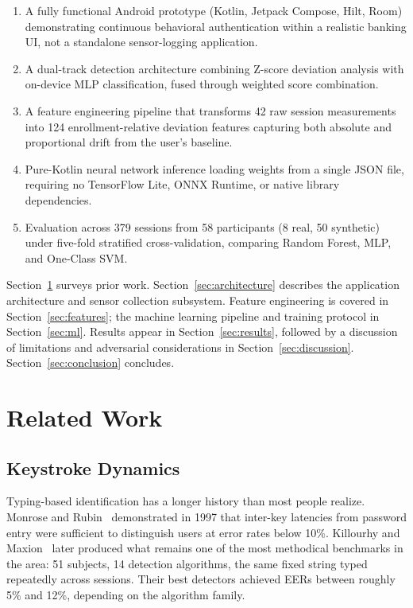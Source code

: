 \documentclass[conference]{IEEEtran}
\begin{document}
\begin{enumerate}
\item A fully functional Android prototype (Kotlin, Jetpack Compose, Hilt, Room) demonstrating continuous behavioral authentication within a realistic banking UI, not a standalone sensor-logging application.
\item A dual-track detection architecture combining Z-score deviation analysis with on-device MLP classification, fused through weighted score combination.
\item A feature engineering pipeline that transforms 42 raw session measurements into 124 enrollment-relative deviation features capturing both absolute and proportional drift from the user's baseline.
\item Pure-Kotlin neural network inference loading weights from a single JSON file, requiring no TensorFlow Lite, ONNX Runtime, or native library dependencies.
\item Evaluation across 379 sessions from 58 participants (8 real, 50 synthetic) under five-fold stratified cross-validation, comparing Random Forest, MLP, and One-Class SVM.
\end{enumerate}

Section~\ref{sec:related} surveys prior work. Section~\ref{sec:architecture} describes the application architecture and sensor collection subsystem. Feature engineering is covered in Section~\ref{sec:features}; the machine learning pipeline and training protocol in Section~\ref{sec:ml}. Results appear in Section~\ref{sec:results}, followed by a discussion of limitations and adversarial considerations in Section~\ref{sec:discussion}. Section~\ref{sec:conclusion} concludes.


\section{Related Work}
\label{sec:related}

\subsection{Keystroke Dynamics}

Typing-based identification has a longer history than most people realize. Monrose and Rubin~\cite{monrose1997keystroke} demonstrated in 1997 that inter-key latencies from password entry were sufficient to distinguish users at error rates below 10\%. Killourhy and Maxion~\cite{killourhy2009comparing} later produced what remains one of the most methodical benchmarks in the area: 51 subjects, 14 detection algorithms, the same fixed string typed repeatedly across sessions. Their best detectors achieved EERs between roughly 5\% and 12\%, depending on the algorithm family.
\end{document}
